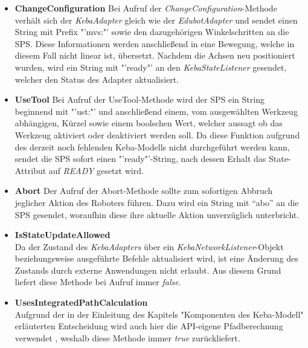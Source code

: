 \begin{itemize}
\item \textbf{ChangeConfiguration}
\newline
Bei Aufruf der \textit{ChangeConfiguration}-Methode verhält sich der \textit{KebaAdapter} gleich wie der \textit{EdubotAdapter} und sendet einen String mit Prefix "'mvs:"' sowie den dazugehörigen Winkelschritten an die SPS. Diese Informationen werden anschließend in eine Bewegung, welche in diesem Fall nicht linear ist, übersetzt. Nachdem die Achsen neu positioniert wurden, wird ein String mit "'ready"' an den \textit{KebaStateListener} gesendet, welcher den Status des Adapter aktualisiert. 
\item \textbf{UseTool}
\newline
Bei Aufruf der UseTool-Methode wird der SPS ein String beginnend mit "'ust:"' und anschließend einem, vom ausgewählten Werkzeug abhängigen, Kürzel sowie einem boolschen Wert, welcher aussagt ob das Werkzeug aktiviert oder deaktiviert werden soll. Da diese Funktion aufgrund des derzeit noch fehlenden Keba-Modells nicht durchgeführt werden kann, sendet die SPS sofort einen "'ready"'-String, nach dessen Erhalt das State-Attribut auf \textit{READY} gesetzt wird. 
\item \textbf{Abort}
\newline
Der Aufruf der Abort-Methode sollte zum sofortigen Abbruch jeglicher Aktion des Roboters führen. Dazu wird ein String mit “abo” an die SPS gesendet, woraufhin diese ihre aktuelle Aktion unverzüglich unterbricht. 
\item \textbf{IsStateUpdateAllowed}\\
Da der Zustand des \textit{KebaAdapters} über ein \textit{KebaNetworkListener}-Objekt beziehungsweise ausgeführte Befehle aktualisiert wird, ist eine Änderung des Zustands durch externe Anwendungen nicht erlaubt. Aus diesem Grund liefert diese Methode bei Aufruf immer \textit{false}.
\item \textbf{UsesIntegratedPathCalculation}\\
Aufgrund der in der Einleitung des Kapitels "Komponenten des Keba-Modell" erläuterten Entscheidung wird auch hier die API-eigene Pfadberechnung verwendet , weshalb diese Methode immer \textit{true} zurückliefert.
\end{itemize}